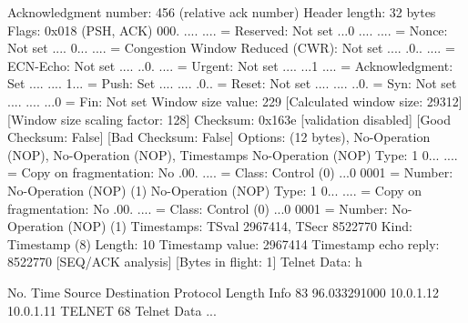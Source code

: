     Acknowledgment number: 456    (relative ack number)
    Header length: 32 bytes
    Flags: 0x018 (PSH, ACK)
        000. .... .... = Reserved: Not set
        ...0 .... .... = Nonce: Not set
        .... 0... .... = Congestion Window Reduced (CWR): Not set
        .... .0.. .... = ECN-Echo: Not set
        .... ..0. .... = Urgent: Not set
        .... ...1 .... = Acknowledgment: Set
        .... .... 1... = Push: Set
        .... .... .0.. = Reset: Not set
        .... .... ..0. = Syn: Not set
        .... .... ...0 = Fin: Not set
    Window size value: 229
    [Calculated window size: 29312]
    [Window size scaling factor: 128]
    Checksum: 0x163e [validation disabled]
        [Good Checksum: False]
        [Bad Checksum: False]
    Options: (12 bytes), No-Operation (NOP), No-Operation (NOP), Timestamps
        No-Operation (NOP)
            Type: 1
                0... .... = Copy on fragmentation: No
                .00. .... = Class: Control (0)
                ...0 0001 = Number: No-Operation (NOP) (1)
        No-Operation (NOP)
            Type: 1
                0... .... = Copy on fragmentation: No
                .00. .... = Class: Control (0)
                ...0 0001 = Number: No-Operation (NOP) (1)
        Timestamps: TSval 2967414, TSecr 8522770
            Kind: Timestamp (8)
            Length: 10
            Timestamp value: 2967414
            Timestamp echo reply: 8522770
    [SEQ/ACK analysis]
        [Bytes in flight: 1]
Telnet
    Data: h

No.     Time           Source                Destination           Protocol Length Info
     83 96.033291000   10.0.1.12             10.0.1.11             TELNET   68     Telnet Data ...

